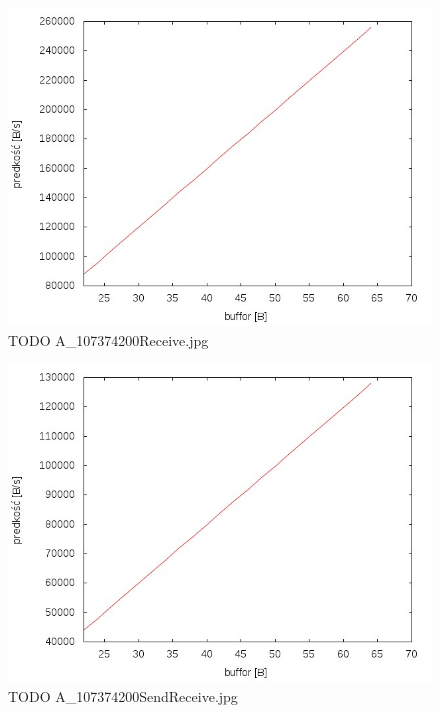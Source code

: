\documentclass{BscUS}
\begin{document}
\begin{figure}[h]
\centering
\includegraphics{./img/A_107374200Receive}
\caption{TODO A\_107374200Receive.jpg}
\end{figure}

\begin{figure}[h]
\centering
\includegraphics{./img/A_107374200SendReceive}
\caption{TODO A\_107374200SendReceive.jpg}
\end{figure}

\end{document}

